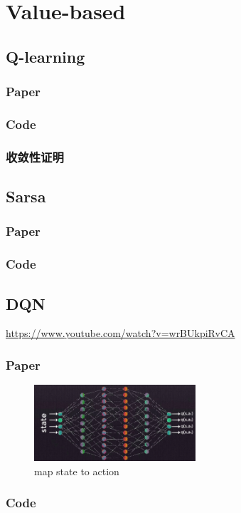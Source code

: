 \documentclass{book}
\begin{document}
\chapter{Value-based}
\section{Q-learning}
\subsection{Paper}
\subsection{Code}
\subsection{收敛性证明}
\section{Sarsa}
\subsection{Paper}
\subsection{Code}
\section{DQN}
\url{https://www.youtube.com/watch?v=wrBUkpiRvCA}\\
\subsection{Paper}
\begin{figure}[!htbp]
\centering
\includegraphics[width=6cm]{./res/DQN.jpg}
\caption{map state to action}
\end{figure}
\subsection{Code}
\end{document}
